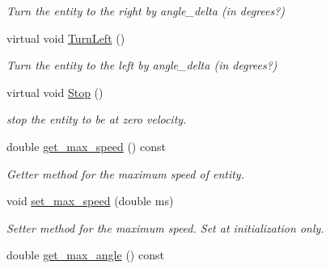 \begin{DoxyCompactItemize}
\begin{DoxyCompactList}\small\item\em Turn the entity to the right by angle\+\_\+delta (in degrees?) \end{DoxyCompactList}\item 
virtual void \hyperlink{class_motion_handler_a922e3dd8c6a98b54607837c5e669c557}{Turn\+Left} ()\hypertarget{class_motion_handler_a922e3dd8c6a98b54607837c5e669c557}{}\label{class_motion_handler_a922e3dd8c6a98b54607837c5e669c557}

\begin{DoxyCompactList}\small\item\em Turn the entity to the left by angle\+\_\+delta (in degrees?) \end{DoxyCompactList}\item 
virtual void \hyperlink{class_motion_handler_aa04a0d87165965ea7ba8be6b21cfa0cf}{Stop} ()\hypertarget{class_motion_handler_aa04a0d87165965ea7ba8be6b21cfa0cf}{}\label{class_motion_handler_aa04a0d87165965ea7ba8be6b21cfa0cf}

\begin{DoxyCompactList}\small\item\em stop the entity to be at zero velocity. \end{DoxyCompactList}\item 
double \hyperlink{class_motion_handler_a4024f3b5562b5e49bfaeab9f82c0762b}{get\+\_\+max\+\_\+speed} () const \hypertarget{class_motion_handler_a4024f3b5562b5e49bfaeab9f82c0762b}{}\label{class_motion_handler_a4024f3b5562b5e49bfaeab9f82c0762b}

\begin{DoxyCompactList}\small\item\em Getter method for the maximum speed of entity. \end{DoxyCompactList}\item 
void \hyperlink{class_motion_handler_a32e832d35e73e9db85c16b3ff569196e}{set\+\_\+max\+\_\+speed} (double ms)\hypertarget{class_motion_handler_a32e832d35e73e9db85c16b3ff569196e}{}\label{class_motion_handler_a32e832d35e73e9db85c16b3ff569196e}

\begin{DoxyCompactList}\small\item\em Setter method for the maximum speed. Set at initialization only. \end{DoxyCompactList}\item 
double \hyperlink{class_motion_handler_a55eb7aeb355b6ee86b2bd8751fde6cb5}{get\+\_\+max\+\_\+angle} () const \hypertarget{class_motion_handler_a55eb7aeb355b6ee86b2bd8751fde6cb5}{}\label{class_motion_handler_a55eb7aeb355b6ee86b2bd8751fde6cb5}


\end{DoxyCompactItemize}
